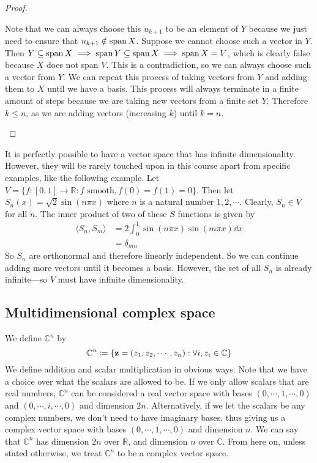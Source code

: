 \begin{proof}
\begin{enumerate}
		      Note that we can always choose this \(u_{k+1}\) to be an element of \(Y\) because we just need to ensure that \(u_{k+1} \notin \operatorname{span} X\).
		      Suppose we cannot choose such a vector in \(Y\).
		      Then \(Y \subseteq \operatorname{span} X \implies \operatorname{span} Y \subseteq \operatorname{span} X \implies \operatorname{span} X = V\), which is clearly false because \(X\) does not span \(V\).
		      This is a contradiction, so we can always choose such a vector from \(Y\).
		      We can repeat this process of taking vectors from \(Y\) and adding them to \(X\) until we have a basis.
		      This process will always terminate in a finite amount of steps because we are taking new vectors from a finite set \(Y\).
		      Therefore \(k \leq n\), as we are adding vectors (increasing \(k\)) until \(k=n\).
	\end{enumerate}
\end{proof}

It is perfectly possible to have a vector space that has infinite dimensionality.
However, they will be rarely touched upon in this course apart from specific examples, like the following example.
Let \(V = \{ f: [0, 1] \to \mathbb R: f \text{ smooth}, f(0) = f(1) = 0\}\).
Then let \(S_n(x) = \sqrt 2 \sin(n \pi x)\) where \(n\) is a natural number \(1, 2, \cdots\).
Clearly, \(S_n \in V\) for all \(n\).
The inner product of two of these \(S\) functions is given by
\begin{align*}
	\langle S_n, S_m \rangle & = 2 \int_0^1 \sin(n \pi x) \sin(m \pi x) \dd{x} \\
	                         & = \delta_{mn}
\end{align*}
So \(S_n\) are orthonormal and therefore linearly independent.
So we can continue adding more vectors until it becomes a basis.
However, the set of all \(S_n\) is already infinite---so \(V\) must have infinite dimensionality.

\subsection{Multidimensional complex space}
We define \(\mathbb C^n\) by
\[
	\mathbb C^n \coloneq \{ \vb z = (z_1, z_2, \cdots, z_n): \forall i, z_i \in \mathbb C \}
\]
We define addition and scalar multiplication in obvious ways.
Note that we have a choice over what the scalars are allowed to be.
If we only allow scalars that are real numbers, \(\mathbb C^n\) can be considered a real vector space with bases \((0, \cdots, 1, \cdots, 0)\) and \((0, \cdots, i, \cdots, 0)\) and dimension \(2n\).
Alternatively, if we let the scalars be any complex numbers, we don't need to have imaginary bases, thus giving us a complex vector space with bases \((0, \cdots, 1, \cdots, 0)\) and dimension \(n\).
We can say that \(\mathbb C^n\) has dimension \(2n\) over \(\mathbb R\), and dimension \(n\) over \(\mathbb C\).
From here on, unless stated otherwise, we treat \(\mathbb C^n\) to be a complex vector space.

